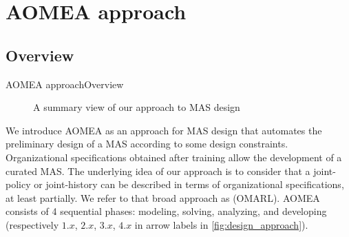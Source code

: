 \AtBeginSection[]{
    \begin{frame}
        \frametitle{}
        \tableofcontents[currentsection]
    \end{frame}
}


\section{AOMEA approach}

\subsection{Overview}

\begin{frame}{AOMEA approach}{Overview}

    \begin{figure}[h!]
        \centering
        
        \caption{A summary view of our approach to MAS design}
        \label{fig:design_approach}
    \end{figure}

    We introduce AOMEA as an approach for MAS design that automates the preliminary design of a MAS according to some design constraints. Organizational specifications obtained after training allow the development of a curated MAS.
    The underlying idea of our approach is to consider that a joint-policy or joint-history can be described in terms of organizational specifications, at least partially.
    We refer to that broad approach as  (OMARL).
    AOMEA consists of 4 sequential phases: modeling, solving, analyzing, and developing (respectively $1.x$, $2.x$, $3.x$, $4.x$ in arrow labels in \autoref{fig:design_approach}).


\end{frame}
